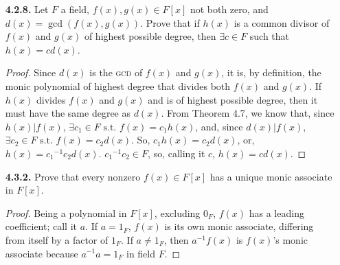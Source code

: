 \documentclass[12pt]{article}
\newcommand{\such}{\text{ s.t. }}
\begin{document}
\begin{itemize}
\item[\textbf{4.2.8.}] Let $F$ a field, $f(x),g(x)\in F[x]$ not both zero, and $d(x)=\gcd(f(x),g(x))$.
Prove that if $h(x)$ is a common divisor of $f(x)$ and $g(x)$ of highest possible degree,
then $\exists c\in F$ such that $h(x)=c d(x)$.

\begin{proof}
  Since $d(x)$ is the \textsc{gcd} of $f(x)$ and $g(x)$, it is, by definition, the monic polynomial of highest degree that divides both $f(x)$ and $g(x)$.
  If $h(x)$ divides $f(x)$ and $g(x)$ and is of highest possible degree, then it must have the same degree as $d(x)$.
  From Theorem 4.7, we know that, since $h(x)|f(x)$, $\exists c_1 \in F \such f(x)=c_1h(x)$,
  and, since $d(x)|f(x)$, $\exists c_2 \in F \such f(x)=c_2d(x)$.
  So, $c_1h(x) = c_2d(x)$, or, $h(x)={c_1}^{-1}c_2d(x)$.
  ${c_1}^{-1}c_2 \in F$, so, calling it $c$, $h(x)=c d(x)$.
\end{proof}

\item[\textbf{ 4.3.2.}] Prove that every nonzero $f(x)\in F[x]$ has a unique monic associate in $F[x]$.

\begin{proof}
  Being a polynomial in $F[x]$, excluding $0_F$, $f(x)$ has a leading coefficient; call it $a$.
  If $a=1_F$, $f(x)$ is its own monic associate, differing from itself by a factor of $1_F$.
  If $a \neq 1_F$, then $a^{-1}f(x)$ is $f(x)$'s monic associate because $a^{-1}a=1_F$ in field $F$.
\end{proof}


\end{itemize}
\end{document}
